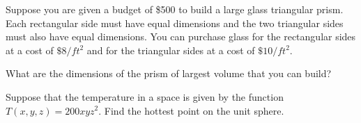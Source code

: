 \item
{}

Suppose you are given a budget of \$500 to build a large glass
triangular prism.  Each rectangular side must have equal dimensions
and the two triangular sides must also have equal dimensions.  You
can purchase glass for the rectangular sides at a cost of $\$8/ft^2$
and for the triangular sides at a cost of $\$10/ft^2$.

What are the dimensions of the prism of largest volume that you can build?

\item
{}

Suppose that the temperature in a space is given by the function
$T(x,y,z) = 200xyz^2$.  Find the hottest point on the unit sphere.

\EEN
